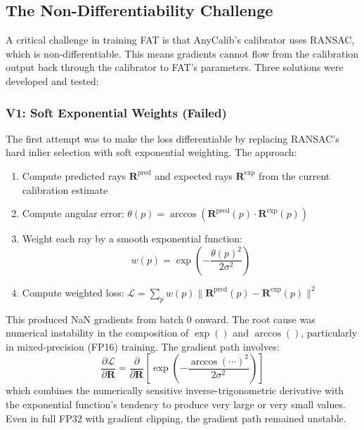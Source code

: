 \subsection{The Non-Differentiability Challenge}

A critical challenge in training FAT is that AnyCalib's calibrator uses RANSAC, which is non-differentiable. This means gradients cannot flow from the calibration output back through the calibrator to FAT's parameters. Three solutions were developed and tested:

\subsubsection{V1: Soft Exponential Weights (Failed)}

The first attempt was to make the loss differentiable by replacing RANSAC's hard inlier selection with soft exponential weighting. The approach:
\begin{enumerate}
    \item Compute predicted rays $\mathbf{R}^{\text{pred}}$ and expected rays $\mathbf{R}^{\text{exp}}$ from the current calibration estimate
    \item Compute angular error: $\theta(p) = \arccos(\mathbf{R}^{\text{pred}}(p) \cdot \mathbf{R}^{\text{exp}}(p))$
    \item Weight each ray by a smooth exponential function:
    \begin{equation}
        w(p) = \exp\left(-\frac{\theta(p)^2}{2\sigma^2}\right)
    \end{equation}
    \item Compute weighted loss: $\mathcal{L} = \sum_p w(p) \|\mathbf{R}^{\text{pred}}(p) - \mathbf{R}^{\text{exp}}(p)\|^2$
\end{enumerate}

This produced NaN gradients from batch 0 onward. The root cause was numerical instability in the composition of $\exp()$ and $\arccos()$, particularly in mixed-precision (FP16) training. The gradient path involves:
\begin{equation}
    \frac{\partial \mathcal{L}}{\partial \mathbf{R}} = \frac{\partial}{\partial \mathbf{R}} \left[ \exp\left(-\frac{\arccos(\cdots)^2}{2\sigma^2}\right) \right]
\end{equation}
which combines the numerically sensitive inverse-trigonometric derivative with the exponential function's tendency to produce very large or very small values. Even in full FP32 with gradient clipping, the gradient path remained unstable.

